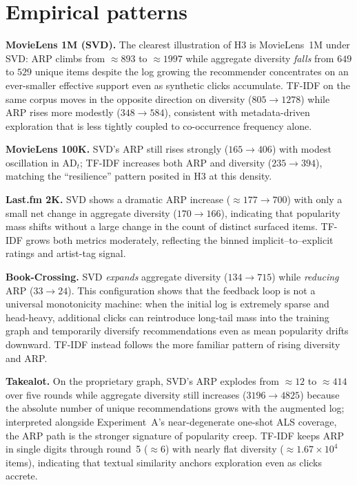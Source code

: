 \section{Empirical patterns}
\textbf{MovieLens 1M (SVD).} The clearest illustration of H3 is MovieLens~1M under SVD: $\mathrm{ARP}$ climbs from $\approx 893$ to $\approx 1997$ while aggregate diversity \emph{falls} from $649$ to $529$ unique items despite the log growing the recommender concentrates on an ever-smaller effective support even as synthetic clicks accumulate. TF-IDF on the same corpus moves in the opposite direction on diversity ($805 \rightarrow 1278$) while ARP rises more modestly ($348 \rightarrow 584$), consistent with metadata-driven exploration that is less tightly coupled to co-occurrence frequency alone.

\textbf{MovieLens 100K.} SVD's ARP still rises strongly ($165 \rightarrow 406$) with modest oscillation in $\mathrm{AD}_t$; TF-IDF increases both ARP and diversity ($235 \rightarrow 394$), matching the ``resilience'' pattern posited in H3 at this density.

\textbf{Last.fm 2K.} SVD shows a dramatic ARP increase ($\approx 177 \rightarrow 700$) with only a small net change in aggregate diversity ($170 \rightarrow 166$), indicating that popularity mass shifts without a large change in the count of distinct surfaced items. TF-IDF grows both metrics moderately, reflecting the binned implicit--to--explicit ratings and artist-tag signal.

\textbf{Book-Crossing.} SVD \emph{expands} aggregate diversity ($134 \rightarrow 715$) while \emph{reducing} ARP ($33 \rightarrow 24$). This configuration shows that the feedback loop is not a universal monotonicity machine: when the initial log is extremely sparse and head-heavy, additional clicks can reintroduce long-tail mass into the training graph and temporarily diversify recommendations even as mean popularity drifts downward. TF-IDF instead follows the more familiar pattern of rising diversity and ARP.

\textbf{Takealot.} On the proprietary graph, SVD's ARP explodes from $\approx 12$ to $\approx 414$ over five rounds while aggregate diversity still increases ($3196 \rightarrow 4825$) because the absolute number of unique recommendations grows with the augmented log; interpreted alongside Experiment~A's near-degenerate one-shot ALS coverage, the ARP path is the stronger signature of popularity creep. TF-IDF keeps ARP in single digits through round~5 ($\approx 6$) with nearly flat diversity ($\approx 1.67\times 10^{4}$ items), indicating that textual similarity anchors exploration even as clicks accrete.

